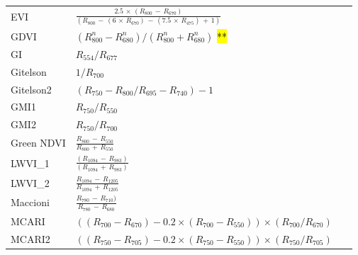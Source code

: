 \documentclass[remotesensing,article,accept,moreauthors,pdftex]{Definitions/mdpi}
\begin{document}
\begin{paracol}{2}
\begin{specialtable}[H]
{\begin{tabular}{lll}
		EVI             & $\frac{2.5\,\times\, (R_{800}\,-\,R_{670}) }{ (R_{800}\,-\,(6\,\times\, R_{670})\,-\,(7.5\,\times\, R_{475})\,+\,1)}$           &~\cite{huete1997}             \\
		GDVI            & $(R_{800}^n-R_{680}^n) / (R_{800}^n+R_{680}^n)$ \hl{**                                                   } %
 &~\cite{wu2014}                 \\
		GI              & $R_{554}/R_{677}$                                                                                    &~\cite{smith1995}              \\
		Gitelson        & $1/R_{700}$                                                                                          &~\cite{gitelson1999}           \\
		Gitelson2       & $(R_{750}-R_{800}/R_{695}-R_{740})-1$                                                                &~\cite{gitelson2003}           \\
		GMI1            & $R_{750}/R_{550}$                                                                                    &~\cite{gitelson2003}           \\
		GMI2            & $R_{750}/R_{700}$                                                                                    &~\cite{gitelson2003}           \\
		Green NDVI      & $\frac{R_{800}\,-\,R_{550}}{R_{800}\,+\,R_{550}}$                                                            &~\cite{gitelson1996}           \\
		LWVI\_1         & $\frac{(R_{1094}\,-\,R_{983})}{(R_{1094}\,+\,R_{983})}$                                                      &~\cite{galvao2005}             \\
		LWVI\_2         & $\frac{R_{1094}\,-\,R_{1205}}{R_{1094}\,+\,R_{1205}}$                                                        &~\cite{galvao2005}             \\
		Maccioni        & $\frac{R_{780}\,-\,R_{710})}{R_{780}\,-\,R_{680}}$                                                           &~\cite{maccioni2001}           \\
		\midrule
		MCARI           & \parbox{5.5cm}{$((R_{700}-R_{670})-0.2\times (R_{700}-R_{550})) \times (R_{700}/R_{670})$}           &~\cite{daughtry2000}           \\
		\midrule
		MCARI2          & \parbox{5.5cm}{$((R_{750}-R_{705})-0.2 \times (R_{750}-R_{550})) \times (R_{750}/R_{705})$}          &~\cite{wu2008}                \\

\end{tabular}}
\end{specialtable}
\end{paracol}
\end{document}
